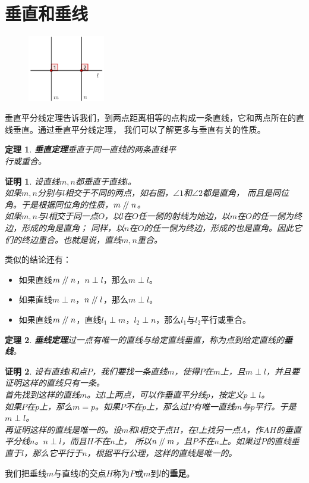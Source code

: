 \documentclass[12pt,UTF8]{ctexbook}
\newtheorem{tm}{定理}[section]
\newtheorem*{proof2}{证明}
\renewcommand\parallel{\mathrel{/\mskip-4mu/}}
\begin{document}
\section{垂直和垂线}

\begin{figure} %
    \includegraphics[width=0.3\textwidth]{三角形6.png}
\end{figure}
垂直平分线定理告诉我们，到两点距离相等的点构成一条直线，它和两点所在的直线垂直。通过垂直平分线定理，
我们可以了解更多与垂直有关的性质。

\begin{tm}{\textbf{垂直定理}}\label{tm:3-1-0}
    垂直于同一直线的两条直线平\\
    行或重合。
\end{tm}
\begin{proof2}
    设直线$m,n$都垂直于直线$l$。\\
    如果$m,n$分别与$l$相交于不同的两点，如右图，$\angle 1$和$\angle 2$都是直角，
    而且是同位角。于是根据同位角的性质，$m \parallel n$。\\
    如果$m,n$与$l$相交于同一点$O$，以$l$在$O$任一侧的射线为始边，以$m$在$O$的任一侧为终边，形成的角是直角；
    同样，以$n$在$O$的任一侧为终边，形成的也是直角。因此它们的终边重合。也就是说，直线$m,n$重合。
\end{proof2}
类似的结论还有：
\begin{itemize}
    \item 如果直线$m \parallel n$，$n \perp l$，那么$m \perp l$。
    \item 如果直线$m \perp n$，$n \parallel l$，那么$m \perp l$。
    \item 如果直线$m \parallel n$，直线$l_1 \perp m$，$l_2 \perp n$，那么$l_1$与$l_2$平行或重合。
\end{itemize}
\begin{tm}{\textbf{垂线定理}}\label{tm:3-1-1}
    过一点有唯一的直线与给定直线垂直，称为点到给定直线的\textbf{垂线}。
\end{tm}
\begin{proof2}
    设有直线$l$和点$P$，我们要找一条直线$m$，使得$P$在$m$上，且$m\perp l$，并且要证明这样的直线只有一条。\\
    首先找到这样的直线$m$。过$l$上两点，可以作垂直平分线$p$，按定义$p \perp l$。\\
    如果$P$在$p$上，那么$m=p$。如果$P$不在$p$上，那么过$P$有唯一直线$m$与$p$平行。于是$m\perp l$。\\
    再证明这样的直线是唯一的。设$m$和$l$相交于点$H$，在$l$上找另一点$A$，作$AH$的垂直平分线$n$。$n\perp l$，而且$H$不在$n$上，
    所以$n \parallel m$，且$P$不在$n$上。如果过$P$的直线垂直于$l$，那么它平行于$n$，根据平行公理，这样的直线是唯一的。
\end{proof2}
我们把垂线$m$与直线$l$的交点$H$称为$P$或$m$到$l$的\textbf{垂足}。
\end{document}
